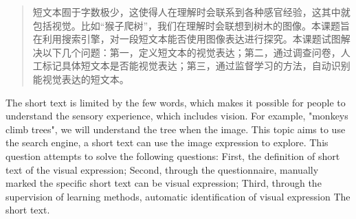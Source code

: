 \begin{abstract}
短文本囿于字数极少，这使得人在理解时会联系到各种感官经验，这其中就包括视觉。比如“猴子爬树”，我们在理解时会联想到树木的图像。本课题旨在利用搜索引擎，对一段短文本能否使用图像表达进行探究。本课题试图解决以下几个问题：第一，定义短文本的视觉表达；第二，通过调查问卷，人工标记具体短文本是否能视觉表达；第三，通过监督学习的方法，自动识别能视觉表达的短文本。
	

\end{abstract}

\begin{enabstract}
The short text is limited by the few words, which makes it possible for people to understand the sensory experience, which includes vision. For example, "monkeys climb trees", we will understand the tree when the image. This topic aims to use the search engine, a short text can use the image expression to explore. This question attempts to solve the following questions: First, the definition of short text of the visual expression; Second, through the questionnaire, manually marked the specific short text can be visual expression; Third, through the supervision of learning methods, automatic identification of visual expression The short text.


\end{enabstract}
